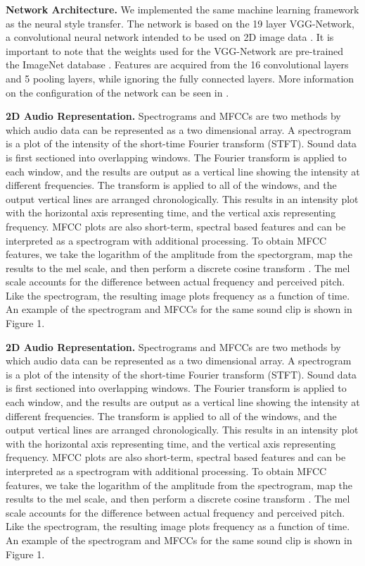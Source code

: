 \documentclass{article}
\begin{document}
\textbf{Network Architecture.} \hspace{0.25cm} We implemented the same machine learning framework as the neural style transfer. The network is based on the 19 layer VGG-Network, a convolutional neural network intended to be used on 2D image data \citep{Simonyan2014}. It is important to note that the weights used for the VGG-Network are pre-trained the ImageNet database \citep{Russ2014}. Features are acquired from the 16 convolutional layers and 5 pooling layers, while ignoring the fully connected layers. More information on the configuration of the network can be seen in \citep{Gatys2015}.

\textbf{2D Audio Representation.} \hspace{0.25cm} Spectrograms and MFCCs are two methods by which audio data can be represented as a two dimensional array. A spectrogram is a plot of the intensity of the short-time Fourier transform (STFT). Sound data is first sectioned into overlapping windows. The Fourier transform is applied to each window, and the results are output as a vertical line showing the intensity at different frequencies. The transform is applied to all of the windows, and the output vertical lines are arranged chronologically. This results in an intensity plot with the horizontal axis representing time, and the vertical axis representing frequency. MFCC plots are also short-term, spectral based features and can be interpreted as a spectrogram with additional processing. To obtain MFCC features, we take the logarithm of the amplitude from the spectorgram, map the results to the mel scale, and then perform a discrete cosine transform \citep{Logan2000}. The mel scale accounts for the difference between actual frequency and perceived pitch. Like the spectrogram, the resulting image plots frequency as a function of time. An example of the spectrogram and MFCCs for the same sound clip is shown in Figure 1.

\textbf{2D Audio Representation.} \hspace{0.25cm} Spectrograms and MFCCs are two methods by which audio data can be represented as a two dimensional array. A spectrogram is a plot of the intensity of the short-time Fourier transform (STFT). Sound data is first sectioned into overlapping windows. The Fourier transform is applied to each window, and the results are output as a vertical line showing the intensity at different frequencies. The transform is applied to all of the windows, and the output vertical lines are arranged chronologically. This results in an intensity plot with the horizontal axis representing time, and the vertical axis representing frequency. MFCC plots are also short-term, spectral based features and can be interpreted as a spectrogram with additional processing. To obtain MFCC features, we take the logarithm of the amplitude from the spectrogram, map the results to the mel scale, and then perform a discrete cosine transform \citep{Logan2000}. The mel scale accounts for the difference between actual frequency and perceived pitch. Like the spectrogram, the resulting image plots frequency as a function of time. An example of the spectrogram and MFCCs for the same sound clip is shown in Figure 1.
\end{document}
